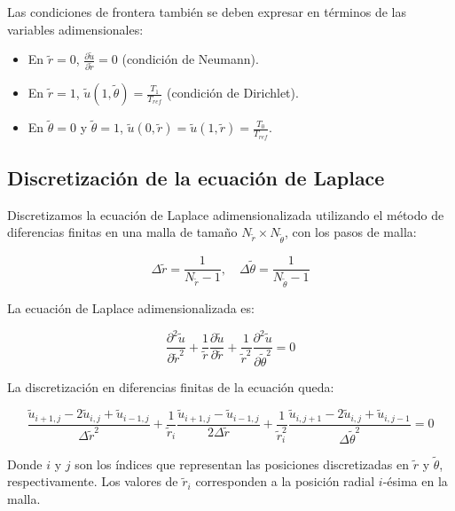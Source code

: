 Las condiciones de frontera también se deben expresar en términos de las variables adimensionales:

\begin{itemize}
    \item En \( \tilde{r} = 0 \), \( \frac{\partial \tilde{u}}{\partial \tilde{r}} = 0 \) (condición de Neumann).
    \item En \( \tilde{r} = 1 \), \( \tilde{u}(1, \tilde{\theta}) = \frac{T_1}{T_{ref}} \) (condición de Dirichlet).
    \item En \( \tilde{\theta} = 0 \) y \( \tilde{\theta} = 1 \), \( \tilde{u}(0, \tilde{r}) = \tilde{u}(1, \tilde{r}) = \frac{T_0}{T_{ref}} \).
\end{itemize}


\subsection{Discretización de la ecuación de Laplace}

Discretizamos la ecuación de Laplace adimensionalizada utilizando el método de diferencias finitas en una malla de tamaño \(N_{\tilde{r}} \times N_{\tilde{\theta}}\), con los pasos de malla:

\[
\Delta \tilde{r} = \frac{1}{N_{\tilde{r}} - 1}, \quad \Delta \tilde{\theta} = \frac{1}{N_{\tilde{\theta}} - 1}
\]

La ecuación de Laplace adimensionalizada es:

\begin{equation}
    \frac{\partial^2 \tilde{u}}{\partial \tilde{r}^2} + \frac{1}{\tilde{r}} \frac{\partial \tilde{u}}{\partial \tilde{r}} + \frac{1}{\tilde{r}^2} \frac{\partial^2 \tilde{u}}{\partial \tilde{\theta}^2} = 0
\end{equation}

La discretización en diferencias finitas de la ecuación queda:

\begin{equation}
    \frac{\tilde{u}_{i+1,j} - 2\tilde{u}_{i,j} + \tilde{u}_{i-1,j}}{\Delta \tilde{r}^2} + \frac{1}{\tilde{r}_i} \frac{\tilde{u}_{i+1,j} - \tilde{u}_{i-1,j}}{2 \Delta \tilde{r}} + \frac{1}{\tilde{r}_i^2} \frac{\tilde{u}_{i,j+1} - 2\tilde{u}_{i,j} + \tilde{u}_{i,j-1}}{\Delta \tilde{\theta}^2} = 0
\end{equation}

Donde \(i\) y \(j\) son los índices que representan las posiciones discretizadas en \(\tilde{r}\) y \(\tilde{\theta}\), respectivamente. Los valores de \(\tilde{r}_i\) corresponden a la posición radial \(i\)-ésima en la malla.

